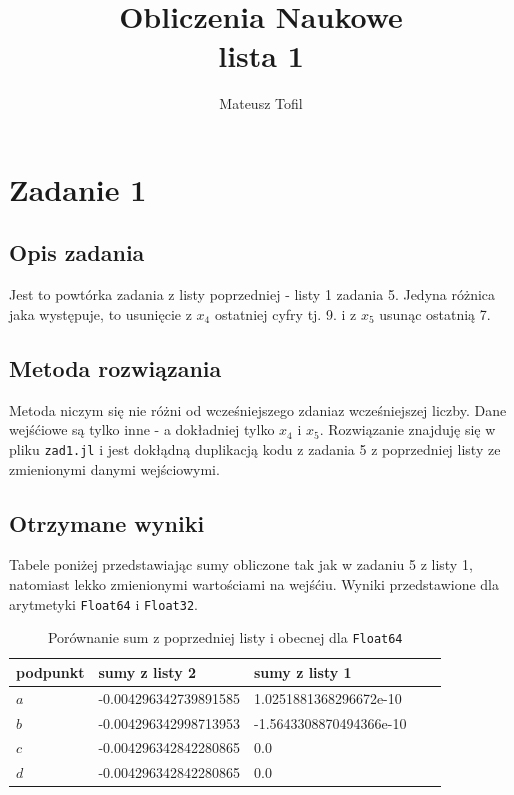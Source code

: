 \documentclass{article}
\begin{document}
\begin{titlepage}
    \title{Obliczenia Naukowe \\ 
    \large lista 1}
    \author{Mateusz Tofil}
    \maketitle
\end{titlepage}

\section{Zadanie 1}

\subsection{Opis zadania}

Jest to powtórka zadania z listy poprzedniej - listy 1 zadania 5. Jedyna różnica jaka występuje, to usunięcie z  \(x_4\) ostatniej cyfry tj. 9. i z \(x_5\) usunąc ostatnią 7.

\subsection{Metoda rozwiązania}

Metoda niczym się nie różni od wcześniejszego zdaniaz  wcześniejszej liczby. Dane wejśćiowe są tylko inne - a dokładniej tylko \(x_4\) i \(x_5\). Rozwiązanie znajduję się w pliku \texttt{zad1.jl} i jest dokłądną duplikacją kodu z zadania 5 z poprzedniej listy ze zmienionymi danymi wejściowymi.

\subsection{Otrzymane wyniki}

Tabele poniżej przedstawiając sumy obliczone tak jak w zadaniu 5 z listy 1, natomiast lekko zmienionymi wartościami na wejśćiu. Wyniki przedstawione dla arytmetyki \texttt{Float64} i \texttt{Float32}.

\begin{table}[h!]
    \centering
    \begin{tabular}{|l|l|l|l|l|}
     \hline
     podpunkt & sumy z listy 2 & sumy z listy 1\\
     \hline
     \(a\) & -0.004296342739891585 & 1.0251881368296672e-10  \\ 
     \(b\) & -0.004296342998713953 & -1.5643308870494366e-10 \\
     \(c\) & -0.004296342842280865 & 0.0 \\
     \(d\) & -0.004296342842280865 & 0.0 \\
     \hline
    \end{tabular}
    \caption{Porównanie sum z poprzedniej listy i obecnej dla \texttt{Float64}}
    \label{table:1}
\end{table}
\end{document}
